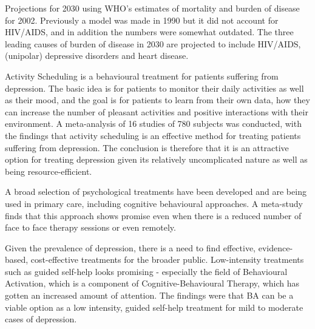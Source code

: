 Projections for 2030 using WHO’s estimates of mortality and  burden of disease for 2002. Previously a model was made in 1990 but it did not account for HIV/AIDS, and in addition the numbers were somewhat outdated. The  three leading causes of burden of disease in 2030 are projected to include HIV/AIDS, (unipolar) depressive disorders and heart disease. 

Activity Scheduling is a behavioural treatment for patients suffering from depression. The basic idea is for patients to monitor their daily activities as well as their mood, and the goal is for patients to learn from their own data, how they can increase the number of pleasant activities and positive interactions with their environment. A meta-analysis of 16 studies of 780 subjects was conducted, with the findings that activity scheduling is an effective method for treating patients suffering from depression. The conclusion is therefore that it is an attractive option for treating depression given its relatively uncomplicated nature as well as being resource-efficient. 

A broad selection of psychological treatments have been developed and are being used in primary care, including cognitive behavioural approaches. A meta-study finds that this approach shows promise even  when there is a reduced number of face to face therapy sessions or even remotely.

Given the prevalence of depression, there is a need to find effective, evidence-based, cost-effective treatments for the broader public. Low-intensity treatments such as guided self-help looks promising - especially the field of  Behavioural Activation, which is a component of Cognitive-Behavioural Therapy, which has gotten an increased amount of attention. The findings were that BA can be a viable option as a low intensity, guided self-help treatment for mild to moderate cases of depression.
